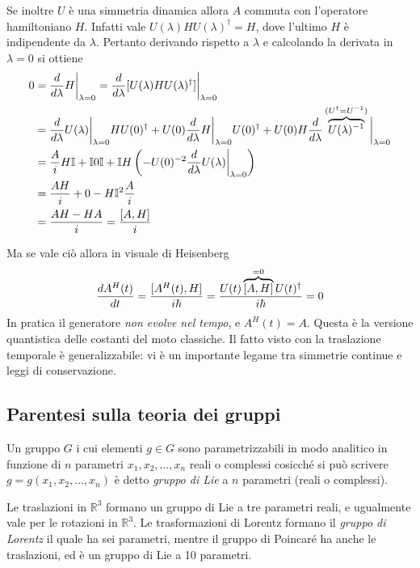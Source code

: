 \documentclass[../../FisicaTeorica.tex]{subfiles}
\begin{document}
Se inoltre $U$ è una simmetria dinamica allora $A$ commuta con l'operatore hamiltoniano $H$. Infatti vale $U(\lambda) H U(\lambda)^\dag = H$, dove l'ultimo $H$ è indipendente da $\lambda$. Pertanto derivando rispetto a $\lambda$ e calcolando la derivata in $\lambda = 0$ si ottiene
\begin{align}
0 & = \frac{d}{d \lambda} H \bigg|_{\lambda = 0} = \frac{d}{d \lambda} [U(\lambda) H U(\lambda)^\dag] \bigg|_{\lambda = 0} \notag \\
& = \frac{d}{d \lambda} U(\lambda) \bigg|_{\lambda = 0} H U(0)^\dag + U(0) \frac{d}{d \lambda} H \bigg|_{\lambda = 0} U(0)^\dag + U(0) H \frac{d}{d \lambda} \overbrace{U(\lambda)^{-1}}^{(U^\dag = U^{-1})} \bigg|_{\lambda = 0} \notag \\
& = \frac{A}{i} H \mathbb{I} + \mathbb{I} 0 \mathbb{I} + \mathbb{I} H \left(- U(0)^{-2} \frac{d}{d \lambda} U(\lambda) \bigg|_{\lambda = 0} \right) \notag \\
& = \frac{A H}{i} + 0 - H \mathbb{I}^2 \frac{A}{i} \notag \\
& = \frac{AH - HA}{i} = \frac{[A,H]}{i} \notag
\end{align}

Ma se vale ciò allora in visuale di Heisenberg
\[
\frac{d A^H(t)}{d t} = \frac{[A^H(t), H]}{i \hbar} = \frac{U(t) \overbrace{[A,H]}^{= 0} U(t)^\dag}{i \hbar} = 0
\]
In pratica il generatore \emph{non evolve nel tempo}, e $A^H(t) = A$. Questa è la versione quantistica delle costanti del moto classiche. Il fatto visto con la traslazione temporale è generalizzabile: vi è un importante legame tra simmetrie continue e leggi di conservazione.

\subsection{Parentesi sulla teoria dei gruppi}
\begin{dfn}
Un gruppo $G$ i cui elementi $g \in G$ sono parametrizzabili in modo analitico in funzione di $n$ parametri $x_1, x_2, \dots, x_n$ reali o complessi cosicché si può scrivere $g = g(x_1, x_2, \dots, x_n)$ è detto \emph{gruppo di Lie} a $n$ parametri (reali o complessi).
\end{dfn}

\begin{es}
Le traslazioni in $\mathbb R^3$ formano un gruppo di Lie a tre parametri reali, e ugualmente vale per le rotazioni in $\mathbb R^3$. Le trasformazioni di Lorentz formano il \emph{gruppo di Lorentz} il quale ha sei parametri, mentre il gruppo di Poincaré ha anche le traslazioni, ed è un gruppo di Lie a 10 parametri.
\end{es}
\end{document}
